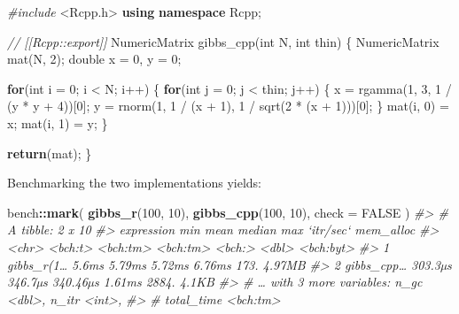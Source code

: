 \documentclass[]{book}
\newenvironment{Shaded}{\begin{snugshade}}{\end{snugshade}}
\newcommand{\CommentTok}[1]{\textcolor[rgb]{0.37,0.37,0.37}{\textit{#1}}}
\newcommand{\ControlFlowTok}[1]{\textcolor[rgb]{0.27,0.27,0.27}{\textbf{#1}}}
\newcommand{\DataTypeTok}[1]{\textcolor[rgb]{0.27,0.27,0.27}{#1}}
\newcommand{\DecValTok}[1]{\textcolor[rgb]{0.06,0.06,0.06}{#1}}
\newcommand{\ImportTok}[1]{#1}
\newcommand{\KeywordTok}[1]{\textcolor[rgb]{0.27,0.27,0.27}{\textbf{#1}}}
\newcommand{\NormalTok}[1]{#1}
\newcommand{\OperatorTok}[1]{\textcolor[rgb]{0.43,0.43,0.43}{\textbf{#1}}}
\newcommand{\OtherTok}[1]{\textcolor[rgb]{0.37,0.37,0.37}{#1}}
\newcommand{\PreprocessorTok}[1]{\textcolor[rgb]{0.37,0.37,0.37}{\textit{#1}}}
\begin{document}
\begin{Shaded}
\begin{Highlighting}[]
\PreprocessorTok{#include }\ImportTok{<Rcpp.h>}
\KeywordTok{using} \KeywordTok{namespace}\NormalTok{ Rcpp;}

\CommentTok{// [[Rcpp::export]]}
\NormalTok{NumericMatrix gibbs_cpp(}\DataTypeTok{int}\NormalTok{ N, }\DataTypeTok{int}\NormalTok{ thin) \{}
\NormalTok{  NumericMatrix mat(N, }\DecValTok{2}\NormalTok{);}
  \DataTypeTok{double}\NormalTok{ x = }\DecValTok{0}\NormalTok{, y = }\DecValTok{0}\NormalTok{;}

  \ControlFlowTok{for}\NormalTok{(}\DataTypeTok{int}\NormalTok{ i = }\DecValTok{0}\NormalTok{; i < N; i++) \{}
    \ControlFlowTok{for}\NormalTok{(}\DataTypeTok{int}\NormalTok{ j = }\DecValTok{0}\NormalTok{; j < thin; j++) \{}
\NormalTok{      x = rgamma(}\DecValTok{1}\NormalTok{, }\DecValTok{3}\NormalTok{, }\DecValTok{1}\NormalTok{ / (y * y + }\DecValTok{4}\NormalTok{))[}\DecValTok{0}\NormalTok{];}
\NormalTok{      y = rnorm(}\DecValTok{1}\NormalTok{, }\DecValTok{1}\NormalTok{ / (x + }\DecValTok{1}\NormalTok{), }\DecValTok{1}\NormalTok{ / sqrt(}\DecValTok{2}\NormalTok{ * (x + }\DecValTok{1}\NormalTok{)))[}\DecValTok{0}\NormalTok{];}
\NormalTok{    \}}
\NormalTok{    mat(i, }\DecValTok{0}\NormalTok{) = x;}
\NormalTok{    mat(i, }\DecValTok{1}\NormalTok{) = y;}
\NormalTok{  \}}

  \ControlFlowTok{return}\NormalTok{(mat);}
\NormalTok{\}}
\end{Highlighting}
\end{Shaded}

Benchmarking the two implementations yields:

\begin{Shaded}
\begin{Highlighting}[]
\NormalTok{bench}\OperatorTok{::}\KeywordTok{mark}\NormalTok{(}
  \KeywordTok{gibbs_r}\NormalTok{(}\DecValTok{100}\NormalTok{, }\DecValTok{10}\NormalTok{),}
  \KeywordTok{gibbs_cpp}\NormalTok{(}\DecValTok{100}\NormalTok{, }\DecValTok{10}\NormalTok{),}
  \DataTypeTok{check =} \OtherTok{FALSE}
\NormalTok{)}
\CommentTok{#> # A tibble: 2 x 10}
\CommentTok{#>   expression     min     mean   median    max `itr/sec` mem_alloc}
\CommentTok{#>   <chr>      <bch:t> <bch:tm> <bch:tm> <bch:>     <dbl> <bch:byt>}
\CommentTok{#> 1 gibbs_r(1…   5.6ms   5.79ms   5.72ms 6.76ms      173.    4.97MB}
\CommentTok{#> 2 gibbs_cpp… 303.3µs  346.7µs 340.46µs 1.61ms     2884.     4.1KB}
\CommentTok{#> # … with 3 more variables: n_gc <dbl>, n_itr <int>,}
\CommentTok{#> #   total_time <bch:tm>}
\end{Highlighting}
\end{Shaded}
\end{document}
